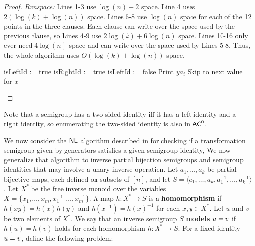 \documentclass{amsart}
\newcommand{\eq}{\ensuremath\mathrel{=}}
\newcommand{\NL}{\ensuremath\mathsf{NL}}
\newcommand{\AC}{\ensuremath\mathsf{AC}}
\newcommand{\LOGSPACE}{\ensuremath\mathsf{L}}
\theoremstyle{remark}
\numberwithin{equation}{section}
\begin{document}
\begin{proof}
\emph{Runspace:} Lines 1-3 use $\log(n)+2$ space. Line 4 uses $2(\log(k)+\log(n))$ space. Lines 5-8 use $\log(n)$ space for each of the 12 points in the three clauses. Each clause can write over the space used by the previous clause, so Lines 4-9 use $2\log(k)+6\log(n)$ space. Lines 10-16 only ever need $4\log(n)$ space and can write over the space used by Lines 5-8. Thus, the whole algorithm uses $O(\log(k)+\log(n))$ space.
  \begin{algorithm}
  \caption{$\LOGSPACE$ algorithm for Enumerate Identities}
    \label{alg:identities}
    \begin{algorithmic}[1]
          \State isLeftId := true
          \State isRightId := true
                \State isLeftId := false
             \EndIf
          \EndFor
                    \State Print $ya_i$
                    \State Skip to next value for $x$
                \EndIf
            \EndFor
          \EndIf
      \EndFor
    \end{algorithmic}
  \end{algorithm}
  \fi
\end{proof}
Note that a semigroup has a two-sided identity iff it has a left identity and a right identity, so enumerating the two-sided identity is also in $\AC^0$.

We now consider the $\NL$ algorithm described in \cite[Thm 5.1]{FJ:CP} for checking if a transformation semigroup given by generators satisfies a given semigroup identity, We now generalize that algorithm to inverse partial bijection semigroups and semigroup identities that may involve a unary inverse operation. Let $a_1,\dots,a_k$ be partial bijective maps, each defined on subsets of $[n]$, and let $S= \langle a_1,\dots,a_k,a_1^{-1},\dots,a_k^{-1}\rangle$. Let $X^*$ be the free inverse monoid over the variables $X = \{x_1,\dots,x_m,x_1^{-1},\dots,x_m^{-1}\}$. A map $h:X^* \to S$ is a {\bf homomorphism} if $h(xy) = h(x)h(y)$ and $h(x^{-1}) = h(x)^{-1}$ for each $x,y \in X^*$. Let $u$ and $v$ be two elements of $X^*$. We say that an inverse semigroup $S$ {\bf models} $u \eq v$ if $h(u) = h(v)$ holds for each homomorphism $h:X^* \to S$. For a fixed identity $u \eq v$, define the following problem:
\end{document}
